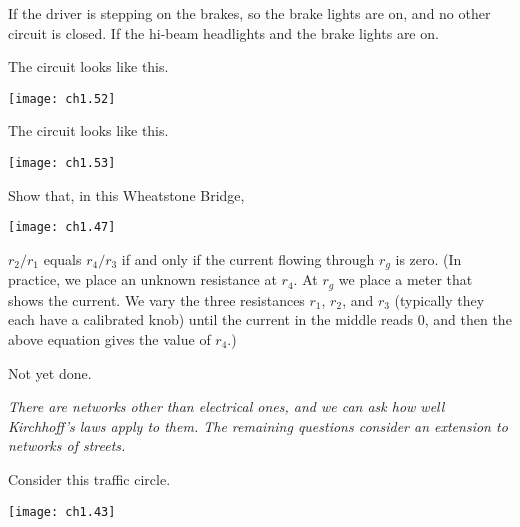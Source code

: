 \begin{exercises}
    \begin{exparts}
     \partsitem If the driver is stepping on the brakes, so the
       brake lights are on, and no other circuit is closed.
     \partsitem If the hi-beam headlights and the brake lights are on.
    \end{exparts}
    \begin{answer}
      \begin{exparts}
        \partsitem The circuit looks like this.
          \begin{center}
            \texttt{[image: ch1.52]}
          \end{center}
        \partsitem The circuit looks like this.
          \begin{center}
            \texttt{[image: ch1.53]}
          \end{center}
      \end{exparts}
    \end{answer}
\item \label{exer:WheatstoneBr} 
   Show that, in this Wheatstone Bridge, 
   \begin{center}
     \texttt{[image: ch1.47]}
   \end{center}
   $r_2/r_1$ equals $r_4/r_3$ if and only if the current
   flowing through $r_g$ is zero.
   (In practice, we place an unknown
   resistance at $r_4$.
   At $r_g$ we place a meter that shows the current.
   We vary the three resistances $r_1$, $r_2$, and $r_3$ (typically
   they each have a calibrated knob) until the 
   current in the middle reads $0$,
   and then the above equation gives the value of $r_4$.)
   \begin{answer}
     Not yet done.                             
   \end{answer}
\item[]\textit{There are networks other than electrical ones, and 
              we can ask how well Kirchhoff's laws apply to them.
              The remaining questions consider an extension to 
              networks of streets.}
\item 
    Consider this traffic circle.
    \begin{center}
      \texttt{[image: ch1.43]}
     \end{center}

\end{exercises}
